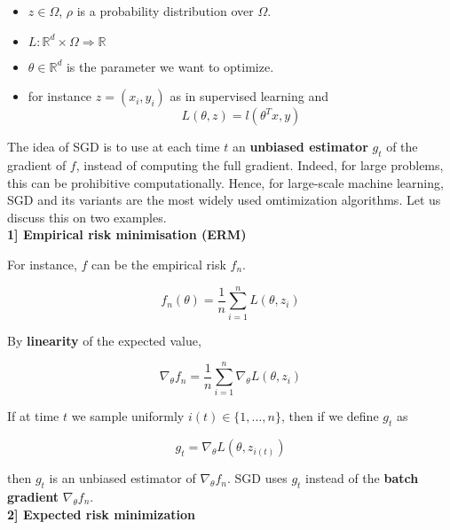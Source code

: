 \documentclass[
10pt, %
a4paper, %
oneside, %
headinclude,footinclude, %
BCOR5mm, %
]{scrartcl}
\begin{document}
\begin{itemize}
    \item $z\in \Omega$, $\rho$ is a probability distribution over $ \Omega$.
    \item $L: \mathbb{R}^d\times \Omega \Rightarrow \mathbb{R}$
    \item $\theta \in \mathbb{R}^d$ is the parameter we want to optimize.
    \item for instance $ z = (x_i, y_i)$ as in supervised learning and
\begin{equation*}
    L(\theta, z) = l(\theta^T x, y)
\end{equation*}
\end{itemize}

The idea of SGD is to use at each time $t$ an \textbf{{unbiased estimator}} $g_t$  of the gradient of $f$, instead of computing the full gradient. Indeed, for large problems, this can be prohibitive computationally. Hence, for large-scale machine learning, SGD and its variants are the most widely used omtimization algorithms. Let us discuss this on two examples.
\\

\textbf{{1] Empirical risk minimisation (ERM)}}

For instance, $f$ can be the empirical risk $f_n$.

\begin{equation*}
    f_n(\theta) =  \frac{1}{n} \sum^{n}_{i=1} L(\theta, z_i)
\end{equation*}

By \textbf{{linearity}} of the expected value,

\begin{equation}
    \label{eq:sgdest}
    \nabla_{\theta}f_n = \frac{1}{n} \sum^{n}_{i=1} \nabla_{\theta}L(\theta, z_i)
\end{equation}

If at time $t$ we sample uniformly $i(t)\in \{1, \dots, n\}$, then if we define $g_t$ as

\begin{equation*}
    g_t = \nabla_{\theta}L(\theta, z_{i(t)})
\end{equation*}

then $g_t$ is an unbiased estimator of $\nabla_{\theta}f_n$. SGD uses $g_t$ instead of the \textbf{{batch gradient}} $\nabla_{\theta}f_n$.
\\

\textbf{{2] Expected risk minimization}} 
\end{document}
